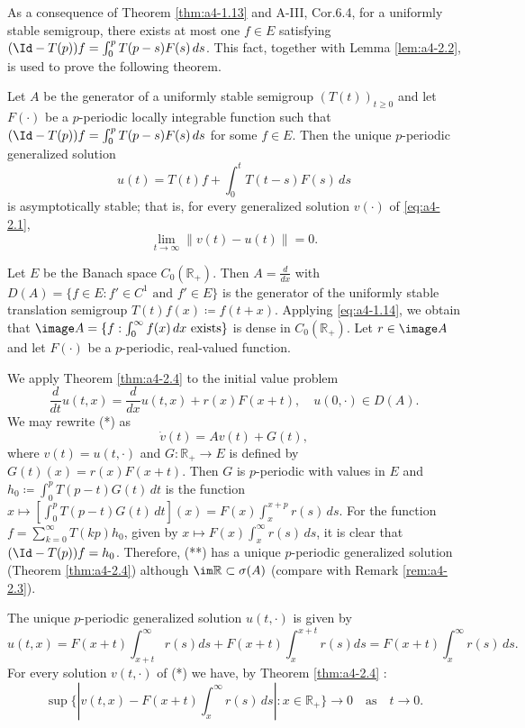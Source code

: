 \bigskip
\noindent
As a consequence of Theorem \ref{thm:a4-1.13}  and A-III, Cor.6.4, for a uniformly stable semigroup, there exists at most one $f \in E$ satisfying $(\Id-T(p))f = \int_{0}^{p} T(p-s)F(s) \, ds$. 
This fact, together with Lemma \ref{lem:a4-2.2}, is used to prove the following theorem.


\begin{theorem}\label{thm:a4-2.4}
Let $A$ be the generator of a uniformly stable semigroup $(T(t))_{t \geq 0}$ and let $F(\cdot)$ be a $p$-periodic locally integrable function such that $(\Id - T(p))f = \int_{0}^{p} T(p-s)F(s) \, ds$ for some $f \in E$. 
Then the unique $p$-periodic generalized solution
\[
u(t) = T(t)f + \int_{0}^{t} T(t-s)F(s) \, ds
\]
is asymptotically stable; that is, for every generalized solution $v(\cdot)$ of \eqref{eq:a4-2.1}, 
\[
\lim_{t \to \infty} \|v(t) - u(t)\| = 0.
\]
\end{theorem}

\begin{example}\label{ex:a4-2.5}
Let $E$ be the Banach space $C_{0}(\mathbb{R}_{+})$. 
Then $A = \frac{d}{dx}$ with $D(A) = \{f \in E: f' \in C^{1} \text{ and } f' \in E\}$ is the generator of the uniformly stable translation semigroup $T(t)f(x) \coloneqq f(t+x)$. 
Applying \eqref{eq:a4-1.14}, we obtain that $\image A = \{f : \int_{0}^{\infty} f(x) \, dx \text{ exists}\}$ is dense in $C_{0}(\mathbb{R}_{+})$. 
Let $r \in \image A$ and let $F(\cdot)$ be a $p$-periodic, real-valued function.

\noindent
We apply Theorem \ref{thm:a4-2.4}  to the initial value problem
\begin{equation}
 \frac{d}{dt} u(t,x) = \frac{d}{dx}u(t,x) + r(x)F(x+t), \quad u(0,\cdot) \in D(A). 
 \tag{*}
\end{equation}
We may rewrite (*) as
\begin{equation}
\dot{v}(t) = Av(t) + G(t), \tag{**}
\end{equation}
where $v(t) = u(t,\cdot)$ and $G : \mathbb{R}_{+} \to E$ is defined by $G(t)(x) = r(x)F(x+t)$.
Then $G$ is $p$-periodic with values in $E$ and $h_{0} \coloneqq \int_{0}^{p} T(p-t)G(t) \, dt$ is the function $x \mapsto \left[\int_{0}^{p} T(p-t)G(t) \, dt\right](x) = F(x)\int_{x}^{x+p} r(s) \, ds$. 
For the function $f = \sum_{k=0}^{\infty} T(kp)h_{0}$, given by $x \mapsto F(x)\int_{x}^{\infty} r(s) \, ds$, it is clear that $(\Id - T(p))f = h_{0}$. 
Therefore, (**) has a unique $p$-periodic generalized solution (Theorem \ref{thm:a4-2.4}) although $\im \mathbb{R} \subset \sigma(A)$ (compare with Remark \ref{rem:a4-2.3}).

\noindent
The unique $p$-periodic generalized solution $u(t,\cdot)$ is given by 
\[
u(t,x) = F(x+t)\int_{x+t}^{\infty} r(s)ds + F(x+t)\int_{x}^{x+t} r(s)ds = F(x+t)\int_{x}^{\infty} r(s)\, ds.
\]
For every solution $v(t,\cdot)$ of (*) we have, by Theorem \ref{thm:a4-2.4} :
\[
\sup\{|v(t,x) - F(x+t)\int_{x}^{\infty} r(s) \, ds| : x \in \mathbb{R}_{+}\} \to 0 \quad \text{as} \quad t \to 0.
\]
\end{example}


